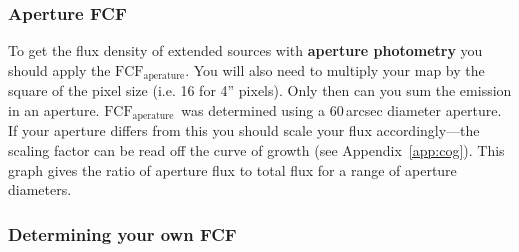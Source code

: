 \documentclass[twoside,11pt]{article}
\newcommand{\htmlref}[2]{#1}
\newcommand{\latexhtml}[2]{#1}
\renewcommand{\_}{\texttt{\symbol{95}}}
\newcommand{\fcfa}{$\mathrm{FCF_{aperature}}$}
\newcommand{\cref}[3]{\latexhtml{#1~\ref{#2}}{\htmlref{#3}{#2}}}
\begin{document}
\subsubsection{Aperture FCF}

To get the flux density of extended sources with \textbf{aperture
photometry} you should apply the \fcfa. You will also need to multiply
your map by the square of the pixel size (i.e. 16 for 4'' pixels).
Only then can you sum the emission in an aperture. \fcfa\ was
determined using a 60\,arcsec diameter aperture. If your aperture
differs from this you should scale your flux accordingly---the scaling
factor can be read off the curve of growth (see
\cref{Appendix}{app:cog}{Aperture Photometry Curve of Growth}). This
graph gives the ratio of aperture flux to total flux for a range of
aperture diameters.

\subsubsection{Determining your own FCF}
\end{document}
